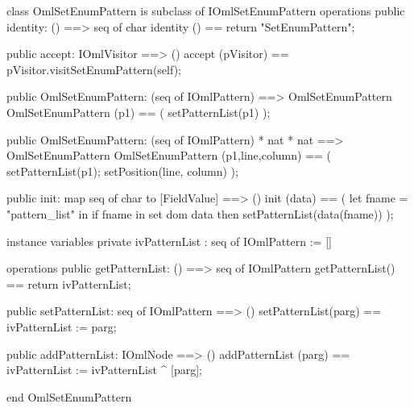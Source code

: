 \begin{vdm_al}
class OmlSetEnumPattern is subclass of IOmlSetEnumPattern
operations
  public identity: () ==> seq of char
  identity () == return "SetEnumPattern";

  public accept: IOmlVisitor ==> ()
  accept (pVisitor) == pVisitor.visitSetEnumPattern(self);

  public OmlSetEnumPattern:
    (seq of IOmlPattern) ==> OmlSetEnumPattern
  OmlSetEnumPattern (p1) == 
    ( setPatternList(p1) );

  public OmlSetEnumPattern:
    (seq of IOmlPattern) *
    nat *
    nat ==> OmlSetEnumPattern
  OmlSetEnumPattern (p1,line,column) == 
    ( setPatternList(p1);
      setPosition(line, column) );

  public init: map seq of char to [FieldValue] ==> ()
  init (data) ==
    ( let fname = "pattern_list" in
        if fname in set dom data
        then setPatternList(data(fname)) );

instance variables
  private ivPatternList : seq of IOmlPattern := []

operations
  public getPatternList: () ==> seq of IOmlPattern
  getPatternList() == return ivPatternList;

  public setPatternList: seq of IOmlPattern ==> ()
  setPatternList(parg) == ivPatternList := parg;

  public addPatternList: IOmlNode ==> ()
  addPatternList (parg) == ivPatternList := ivPatternList ^ [parg];

end OmlSetEnumPattern
\end{vdm_al}

